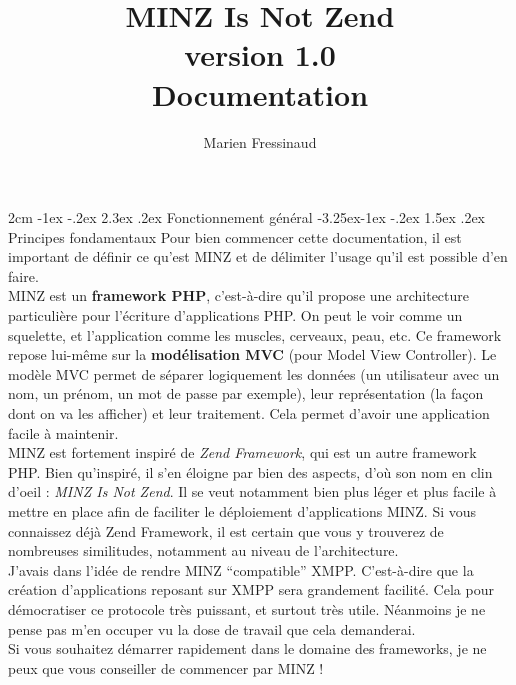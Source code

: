 \documentclass[a4paper,11pt]{article}
\title{MINZ Is Not Zend\\{\small version 1.0}\\[4em] \textbf{Documentation}\\[4em]}
\author{Marien Fressinaud}
\makeatletter
\renewcommand\section{\@startsection{section}{1}{\z@}%
	{2cm \@plus -1ex \@minus -.2ex}%
	{2.3ex \@plus.2ex}%
	{\color{bleuClair}\reset@font\Large\bfseries}}
\renewcommand{\subsection}{\@startsection{subsection}{2}{\z@}%
             {-3.25ex\@plus -1ex \@minus -.2ex}%
             {1.5ex \@plus .2ex}%
             {\color{bleuFonce}\normalfont\large\bfseries}}
\makeatother
\begin{document}
\maketitle

\newpage
\tableofcontents
\newpage
\section{Fonctionnement général}
\subsection{Principes fondamentaux}
Pour bien commencer cette documentation, il est important de définir ce qu'est MINZ et de délimiter l'usage qu'il est possible d'en faire.\\

MINZ est un \textbf{framework PHP}, c'est-à-dire qu'il propose une architecture particulière pour l'écriture d'applications PHP. On peut le voir comme un squelette, et l'application comme les muscles, cerveaux, peau, etc. Ce framework repose lui-même sur la \textbf{modélisation MVC} (pour Model View Controller). Le modèle MVC permet de séparer logiquement les données (un utilisateur avec un nom, un prénom, un mot de passe par exemple), leur représentation (la façon dont on va les afficher) et leur traitement. Cela permet d'avoir une application facile à maintenir.\\

MINZ est fortement inspiré de \textit{Zend Framework}, qui est un autre framework PHP. Bien qu'inspiré, il s'en éloigne par bien des aspects, d'où son nom en clin d'oeil : \textit{MINZ Is Not Zend}. Il se veut notamment bien plus léger et plus facile à mettre en place afin de faciliter le déploiement d'applications MINZ. Si vous connaissez déjà Zend Framework, il est certain que vous y trouverez de nombreuses similitudes, notamment au niveau de l'architecture.\\

J'avais dans l'idée de rendre MINZ ``compatible'' XMPP. C'est-à-dire que la création d'applications reposant sur XMPP sera grandement facilité. Cela pour démocratiser ce protocole très puissant, et surtout très utile. Néanmoins je ne pense pas m'en occuper vu la dose de travail que cela demanderai.\\

Si vous souhaitez démarrer rapidement dans le domaine des frameworks, je ne peux que vous conseiller de commencer par MINZ !
\end{document}
